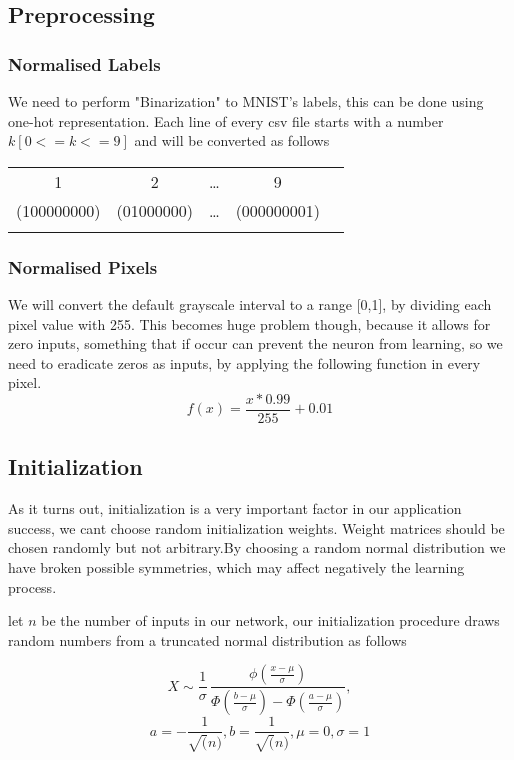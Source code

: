 \documentclass{proc}
\begin{document}
	\subsection{Preprocessing}
	\subsubsection{Normalised Labels}
	We need to perform "Binarization" to MNIST's labels, this can be done using one-hot representation. Each line of every csv file starts with a number ${k[0<=k<=9]}$ and will be converted as follows
	
	\begin{tabular}{ccccc}
			1&                      2&                      \dots&                      9&                      \\
			(100000000)&                      (01000000)&                     \dots&                       (000000001)&                      \\
			\multicolumn{1}{l}{} & \multicolumn{1}{l}{} & \multicolumn{1}{l}{} & \multicolumn{1}{l}{} & \multicolumn{1}{l}{}
	\end{tabular}
	\subsubsection{Normalised Pixels}
	We will convert the default grayscale interval to a range [0,1], by dividing each pixel value with 255. This becomes huge problem though, because it allows for zero inputs, something that if occur can prevent the neuron from learning, so we need to eradicate zeros as inputs, by applying the following function in every pixel.
	\[
		f(x)=\frac{x*0.99}{255}+0.01
	\]
	\subsection{Initialization}
	As it turns out, initialization is a very important factor in our application success, we cant choose random initialization weights. Weight matrices should be chosen randomly but not arbitrary.By choosing a random normal distribution we have broken possible symmetries, which may affect negatively the learning process.
	
	let ${n}$ be the number of inputs in our network, our initialization procedure draws random numbers from a truncated normal distribution as follows
	
	\[
		{\displaystyle X\sim{\frac {1}{\sigma }}\,{\frac {\phi ({\frac {x-\mu }{\sigma }})}{\Phi ({\frac {b-\mu }{\sigma }})-\Phi ({\frac {a-\mu }{\sigma }})}}},
	\]
	\[	a=-\frac{1}{\sqrt(n)},
		b=\frac{1}{\sqrt(n)},
		\mu=0,
		\sigma=1
	\] 
\end{document}
